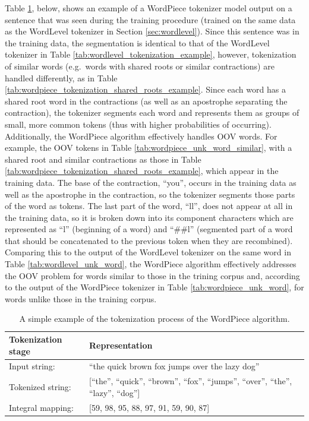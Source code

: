 \documentclass[12pt]{article}
\begin{document}
Table \ref{tab:wordpiece_tokenization_example}, below, shows an example of a WordPiece tokenizer model output on a sentence that was seen during the
training procedure (trained on the same data as the WordLevel tokenizer in Section \ref{sec:wordlevel}). Since this sentence was in the training data,
the segmentation is identical to that of the WordLevel tokenizer in Table \ref{tab:wordlevel_tokenization_example}, however, tokenization of similar
words (e.g.~words with shared roots or similar contractions) are handled differently, as in Table \ref{tab:wordpiece_tokenization_shared_roots_example}.
Since each word has a shared root word in the contractions (as well as an apostrophe separating the contraction), the tokenizer segments each word and
represents them as groups of small, more common tokens (thus with higher probabilities of occurring). Additionally, the WordPiece algorithm
effectively handles OOV words. For example, the OOV tokens in Table \ref{tab:wordpiece_unk_word_similar}, with a shared root and similar contractions
as those in Table \ref{tab:wordpiece_tokenization_shared_roots_example}, which appear in the training data. The base of the contraction, ``you'',
occurs in the training data as well as the apostrophe in the contraction, so the tokenizer segments those parts of the word as tokens. The last part
of the word, ``ll'', does not appear at all in the training data, so it is broken down into its component characters which are represented as ``l''
(beginning of a word) and ``\#\#l'' (segmented part of a word that should be concatenated to the previous token when they are recombined). Comparing
this to the output of the WordLevel tokenizer on the same word in Table \ref{tab:wordlevel_unk_word}, the WordPiece algorithm effectively addresses
the OOV problem for words similar to those in the trining corpus and, according to the output of the WordPiece tokenizer in Table
\ref{tab:wordpiece_unk_word}, for words unlike those in the training corpus.

\begin{table}[!t]
    \centering
    \begin{tabular}{l l}
        \toprule
        Tokenization stage & Representation                                                                            \\
        \midrule
        Input string:      & ``the quick brown fox jumps over the lazy dog''                                           \\
        Tokenized string:  & [``the'', ``quick'', ``brown'', ``fox'', ``jumps'', ``over'', ``the'', ``lazy'', ``dog''] \\
        Integral mapping:  & [59, 98, 95, 88, 97, 91, 59, 90, 87]                                                      \\
        \bottomrule
    \end{tabular}
    \caption{A simple example of the tokenization process of the WordPiece algorithm.}
    \label{tab:wordpiece_tokenization_example}
\end{table}
\end{document}
